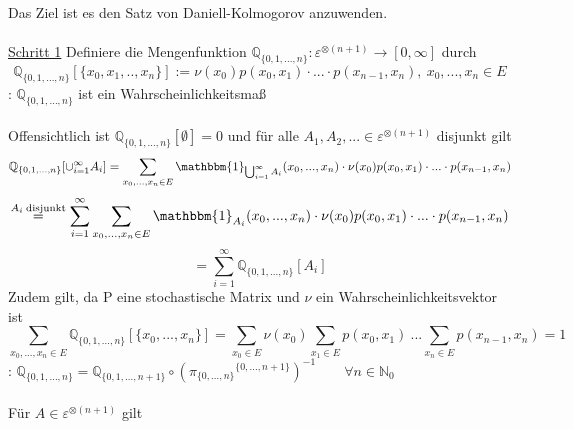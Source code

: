 Das Ziel ist es den Satz von Daniell-Kolmogorov anzuwenden.
\\
\\
\underline{Schritt 1} Definiere die Mengenfunktion $\mathbb{Q}_{\lbrace 0,1,...,n \rbrace}: \varepsilon^{ \otimes (n+1)} \to [0, \infty]$ durch 
\begin{equation*}
\mathbb{Q}_{\lbrace 0,1,...,n \rbrace}[\lbrace x_{0},x_{1},..,x_{n} \rbrace] := \nu(x_{0})p(x_{0},x_{1}) \cdot...\cdot p(x_{n-1},x_{n}), \: x_{0},...,x_{n} \in E
\end{equation*}
:  $\mathbb{Q}_{\lbrace 0,1,...,n \rbrace}$ ist ein Wahrscheinlichkeitsmaß
\\
\\
Offensichtlich ist  $\mathbb{Q}_{\lbrace 0,1,...,n \rbrace}[\emptyset] = 0$ und für alle $A_{1},A_{2},... \in \varepsilon^{ \otimes (n+1)}$ disjunkt gilt
\begin{equation*}
\mathbb{Q}_{\lbrace 0,1,...,n \rbrace}[\cup_{i=1}^{\infty}A_{i}] = \sum _{x_{0},...,x_{n} \in E} \mathbbm{1}_{\bigcup_{i=1}^{\infty}A_{i}}(x_{0},...,x_{n}) \cdot \nu(x_{0})p(x_{0},x_{1}) \cdot ... \cdot p(x_{n-1},x_{n})
\end{equation*}
\begin{equation*}
\stackrel{A_{i} \mathrm{\: disjunkt}}{=} \sum_{i=1}^{\infty} \sum _{x_{0},...,x_{n} \in E} \mathbbm{1}_{A_{i}}(x_{0},...,x_{n}) \cdot \nu(x_{0})p(x_{0},x_{1}) \cdot ... \cdot p(x_{n-1},x_{n})
\end{equation*}
\begin{equation*}
= \sum_{i=1}^{\infty} \mathbb{Q}_{\lbrace 0,1,...,n \rbrace}[A_{i}]
\end{equation*}
Zudem gilt, da P eine stochastische Matrix und $\nu$ ein Wahrscheinlichkeitsvektor ist 
\begin{equation*}
\sum_{x_{0},...,x_{n} \in E} \mathbb{Q}_{\lbrace 0,1,...,n \rbrace}[\lbrace x_{0},...,x_{n} \rbrace] = \sum_{x_{0} \in E} \nu(x_{0}) \sum_{x_{1} \in E} p(x_{0},x_{1}) \: ... \sum_{x_{n} \in E}p(x_{n-1},x_{n}) = 1
\end{equation*}
: $\mathbb{Q}_{\lbrace 0,1,...,n \rbrace} = \mathbb{Q}_{\lbrace 0,1,...,n+1 \rbrace} \circ ({\pi_{\lbrace 0,...,n \rbrace}}^{\lbrace 0,...,n+1 \rbrace})^{-1} \qquad \forall n \in \mathbb{N}_{0}$
\\
\\
Für $A \in \varepsilon^{ \otimes (n+1)}$ gilt

